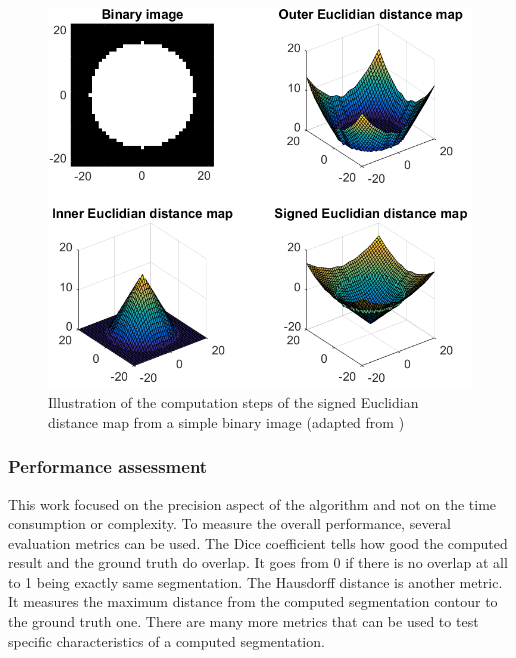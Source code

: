 \begin{figure}[h!]
	\centering
	\includegraphics[width=0.8\linewidth]{img/distMap}
	\caption{Illustration of the computation steps of the signed Euclidian distance map from a simple binary image (adapted from \cite{Rohlfing2007})}
	\label{fig:distMap}
\end{figure}

\subsubsection*{Performance assessment}
This work focused on the precision aspect of the algorithm and not on the time consumption or complexity. To measure the overall performance, several evaluation metrics can be used. The Dice coefficient tells how good the computed result and the ground truth do overlap. It goes from 0 if there is no overlap at all to 1 being exactly same segmentation. The Hausdorff distance is another metric. It measures the maximum distance from the computed segmentation contour to the ground truth one. There are many more metrics that can be used to test specific characteristics of a computed segmentation. 
